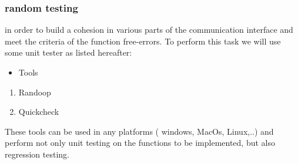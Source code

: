 \documentclass [10pt]{article}
\begin{document}
 \subsubsection{random testing}
in order to build a cohesion in various parts of the communication interface and meet the criteria of the function free-errors. To perform this task we will use some unit tester as listed hereafter:
\
\begin{itemize}
\item Tools
\end{itemize}
\begin{enumerate}
\item Randoop
\item Quickcheck
\end{enumerate}
These tools can be used in any platforms ( windows, MacOs, Linux,..) and perform not only unit testing on the functions to be implemented, but also regression testing.
\newpage
\nocite{*}
\end{document}
